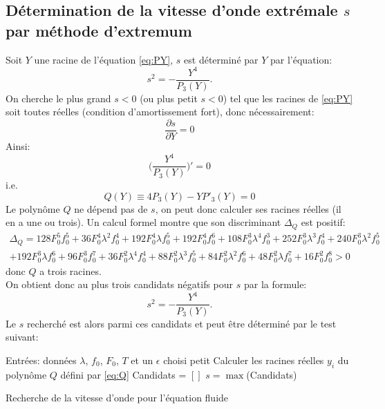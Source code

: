 \documentclass[11pt]{article}
\begin{document}
\subsection{Détermination de la vitesse d'onde extrémale $s$ par méthode d'extremum}
Soit $Y$ une racine de l'équation \ref{eq:PY}, $s$ est déterminé par $Y$ par l'équation: \begin{equation}
	s^2 = -\frac{Y^4}{P_3(Y)}. \label{eq:sfromY}
\end{equation} 
On cherche le plus grand $s<0$ (ou plus petit $s<0$) tel que les racines de \ref{eq:PY} soit toutes réelles (condition d'amortissement fort), donc nécessairement: \begin{equation}
	\frac{\partial s}{\partial Y}=0
\end{equation}
Ainsi: \begin{equation}
	\Big(\frac{Y^4}{P_3(Y)}\Big)'=0
\end{equation} 
i.e. \begin{equation}
\label{eq:Q}	Q(Y)\equiv4P_3(Y)-YP'_3(Y)=0
\end{equation}
Le polynôme $Q$ ne dépend pas de $s$, on peut donc calculer ses racines réelles (il en a une ou trois). Un calcul formel montre que son discriminant $\Delta _Q$ est positif: \begin{multline*}
\Delta _Q = 128F_0^5f_0^5 + 36 F_0^4 \lambda^2 f_0^4 + 192 F_0^4 \lambda f_0^5 + 192 F_0^4 f_0^6 + 108 F_0^3 \lambda^4 f_0^3 + 252 F_0^3 \lambda^3 f_0^4 + 240 F_0^3 \lambda^2 f_0^5 \\+ 192 F_0^3 \lambda f_0^6 + 96 F_0^3 f_0^7 + 36 F_0^2 \lambda^4 f_0^4 + 88 F_0^2 \lambda^3 f_0^5 + 84 F_0^2 \lambda^2 f_0^6 + 48 F_0^2 \lambda f_0^7 + 16 F_0^2 f_0^8 > 0
\end{multline*} donc $Q$ a trois racines.\\
On obtient donc au plus trois candidats négatifs pour $s$ par la formule: \begin{equation*}
	s^2 = -\frac{Y^4}{P_3(Y)}.
\end{equation*}
Le $s$ recherché est alors parmi ces candidats et peut être déterminé par le test suivant: \\

\begin{algorithm}[H]
\SetAlgoLined
{}
 Entrées: données $\lambda$, $f_0$, $F_0$, $T$ et un $\epsilon$ choisi petit\;
 Calculer les racines réelles $y_i$ du polynôme $Q$ défini par \ref{eq:Q}\; 
 Candidats = $[]$\;
 $s= \max$(Candidats)
 \caption{Recherche de la vitesse d'onde pour l’équation fluide}
\end{algorithm}
 \ifdefined\COMPLETE
\else
\end{document}
